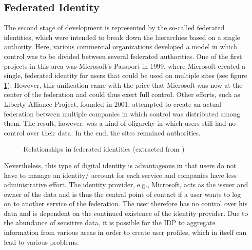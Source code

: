 	    
	    \subsection{Federated Identity}
	    
	    The second stage of development is represented by the so-called federated identities, which were intended to break down the hierarchies based on a single authority. Here, various commercial organizations developed a model in which control was to be divided between several federated authorities. One of the first projects in this area was Microsoft's Passport in 1999, where Microsoft created a single, federated identity for users that could be used on multiple sites (see figure \ref{figure: federated}). However, this unification came with the price that Microsoft was now at the center of the federation and could thus exert full control. Other efforts, such as Liberty Alliance Project, founded in 2001, attempted to create an actual federation between multiple companies in which control was distributed among them. The result, however, was a kind of oligarchy in which users still had no control over their data. In the end, the sites remained authorities. \cite{allen_path_2016}
	    
	    \begin{figure}[ht]
    	    \centering
    	    \makebox[\textwidth]{}
            \caption[Relationships in federated identities]{Relationships in federated identities (extracted from \cite[p. 8]{preukschat_self-sovereign_2021})}
            \label{figure: federated}
        \end{figure}
	    
	    Nevertheless, this type of digital identity is advantageous in that users do not have to manage an identity/ account for each service and companies have less administrative effort. The identity provider, e.g., Microsoft, acts as the issuer and owner of the data and is thus the central point of contact if a user wants to log on to another service of the federation. The user therefore has no control over his data and is dependent on the continued existence of the identity provider. Due to the abundance of sensitive data, it is possible for the \ac{IDP} to aggregate information from various areas in order to create user profiles, which in itself can lead to various problems. \cite[pp. 6 - 7]{ehrlich_self-sovereign_2021}
	    
